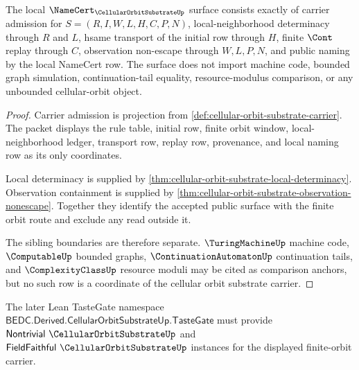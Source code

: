 \begin{theorem}
\label{thm:cellular-orbit-substrate-namecert-surface}
The local $\NameCert_{\CellularOrbitSubstrateUp}$ surface consists exactly of carrier admission for $S=(R,I,W,L,H,C,P,N)$, local-neighborhood determinacy through $R$ and $L$, hsame transport of the initial row through $H$, finite $\Cont$ replay through $C$, observation non-escape through $W,L,P,N$, and public naming by the local NameCert row. The surface does not import machine code, bounded graph simulation, continuation-tail equality, resource-modulus comparison, or any unbounded cellular-orbit object.
\end{theorem}
\begin{proof}
Carrier admission is projection from \autoref{def:cellular-orbit-substrate-carrier}. The packet displays the rule table, initial row, finite orbit window, local-neighborhood ledger, transport row, replay row, provenance, and local naming row as its only coordinates.

Local determinacy is supplied by \autoref{thm:cellular-orbit-substrate-local-determinacy}. Observation containment is supplied by \autoref{thm:cellular-orbit-substrate-observation-nonescape}. Together they identify the accepted public surface with the finite orbit route and exclude any read outside it.

The sibling boundaries are therefore separate. $\TuringMachineUp$ machine code, $\ComputableUp$ bounded graphs, $\ContinuationAutomatonUp$ continuation tails, and $\ComplexityClassUp$ resource moduli may be cited as comparison anchors, but no such row is a coordinate of the cellular orbit substrate carrier.
\end{proof}

The later Lean TasteGate namespace $\mathsf{BEDC.Derived.CellularOrbitSubstrateUp.TasteGate}$ must provide $\mathsf{Nontrivial}\ \CellularOrbitSubstrateUp$ and $\mathsf{FieldFaithful}\ \CellularOrbitSubstrateUp$ instances for the displayed finite-orbit carrier.

